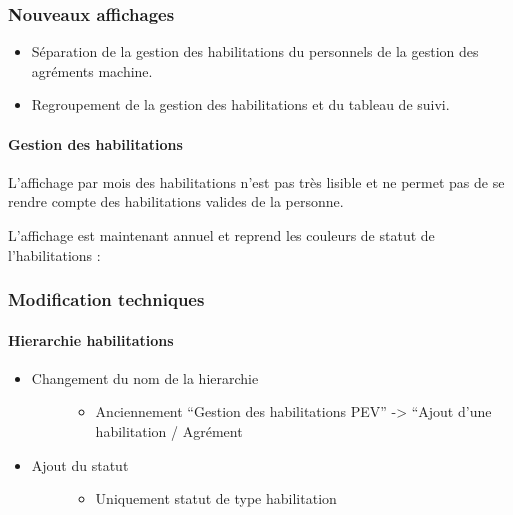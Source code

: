 \documentclass[letterpaper,10pt,english]{sphinxmanual}
\begin{document}
\subsubsection{Nouveaux affichages}
\label{\detokenize{maj/maj_30092019:nouveaux-affichages}}\begin{itemize}
\item {} 
Séparation de la gestion des habilitations du personnels de la gestion des agréments machine.

\item {} 
Regroupement de la gestion des habilitations et du tableau de suivi.

\end{itemize}


\paragraph{Gestion des habilitations}
\label{\detokenize{maj/maj_30092019:gestion-des-habilitations}}
L’affichage par mois des habilitations n’est pas très lisible et ne permet pas de se rendre compte des habilitations valides de la personne.

L’affichage est maintenant annuel et reprend les couleurs de statut de l’habilitations :

\noindent{}


\subsubsection{Modification techniques}
\label{\detokenize{maj/maj_30092019:modification-techniques}}

\paragraph{Hierarchie habilitations}
\label{\detokenize{maj/maj_30092019:hierarchie-habilitations}}\begin{itemize}
\item {} \begin{description}
\item[{Changement du nom de la hierarchie}] \leavevmode\begin{itemize}
\item {} 
Anciennement “Gestion des habilitations PEV” -\textgreater{} “Ajout d’une habilitation / Agrément

\end{itemize}

\end{description}

\item {} \begin{description}
\item[{Ajout du statut}] \leavevmode\begin{itemize}
\item {} 
Uniquement statut de type habilitation

\end{itemize}

\end{description}

\end{itemize}
\end{document}
